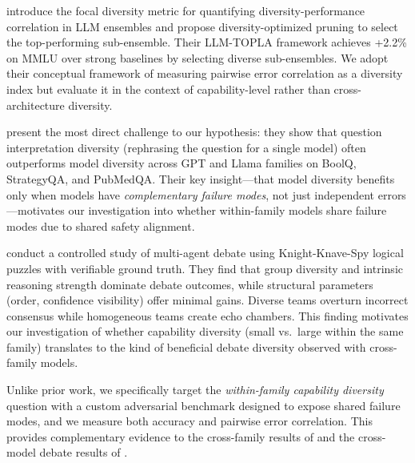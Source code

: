 \citet{tekin2024topla} introduce the focal diversity metric for quantifying
diversity-performance correlation in LLM ensembles and propose
diversity-optimized pruning to select the top-performing sub-ensemble.
Their \textsc{LLM-TOPLA} framework achieves +2.2\% on MMLU over strong baselines
by selecting diverse sub-ensembles.
We adopt their conceptual framework of measuring pairwise error correlation
as a diversity index but evaluate it in the context of capability-level
rather than cross-architecture diversity.

\citet{rosales2025diverse} present the most direct challenge to our hypothesis:
they show that question interpretation diversity (rephrasing the question for a
single model) often outperforms model diversity across GPT and Llama families
on BoolQ, StrategyQA, and PubMedQA.
Their key insight---that model diversity benefits only when models have
\emph{complementary failure modes}, not just independent errors---motivates
our investigation into whether within-family models share failure modes
due to shared safety alignment.

\citet{wu2025debate} conduct a controlled study of multi-agent debate using
Knight-Knave-Spy logical puzzles with verifiable ground truth.
They find that group diversity and intrinsic reasoning strength dominate
debate outcomes, while structural parameters (order, confidence visibility)
offer minimal gains.
Diverse teams overturn incorrect consensus while homogeneous teams create
echo chambers.
This finding motivates our investigation of whether capability diversity
(small vs.\ large within the same family) translates to the kind of beneficial
debate diversity observed with cross-family models.

Unlike prior work, we specifically target the \emph{within-family capability diversity}
question with a custom adversarial benchmark designed to expose shared failure modes,
and we measure both accuracy and pairwise error correlation.
This provides complementary evidence to the cross-family results of
\citet{chen2023reconcile} and the cross-model debate results of \citet{wu2025debate}.
